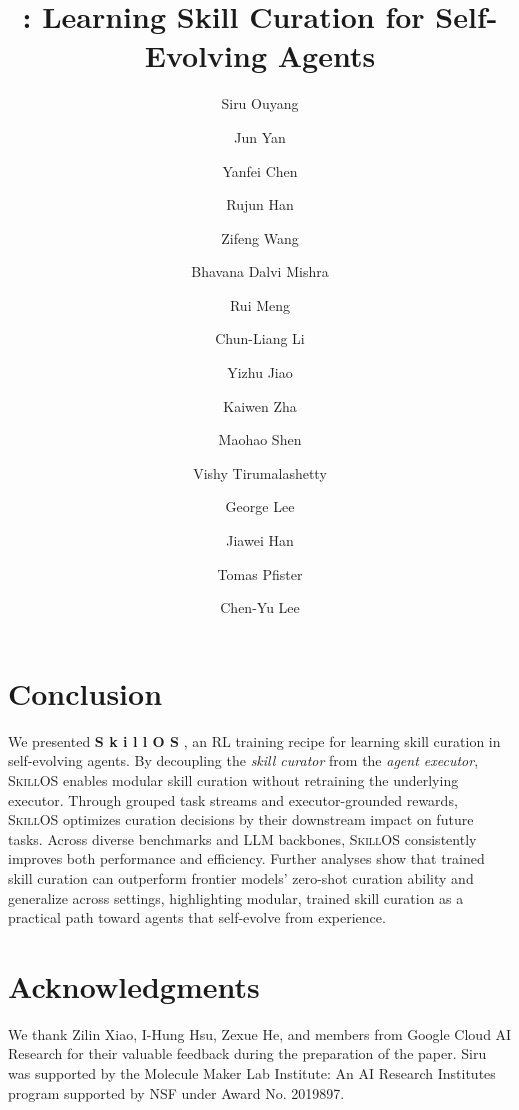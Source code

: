 \documentclass[11pt, a4paper, logo, copyright]{googlecloud}
\title{\skillos{}: Learning Skill Curation for Self-Evolving Agents}
\author[1*]{Siru Ouyang}
\author[2$\dagger$]{Jun Yan}
\author[2]{Yanfei Chen}
\author[2]{Rujun Han}
\author[2]{Zifeng Wang}
\author[2]{Bhavana Dalvi Mishra}
\author[2]{Rui Meng}
\author[2]{Chun-Liang Li}
\author[1]{Yizhu Jiao}
\author[3]{Kaiwen Zha}
\author[3]{Maohao Shen}
\author[2]{Vishy Tirumalashetty}
\author[2]{George Lee}
\author[1]{Jiawei Han}
\author[2]{Tomas Pfister}
\author[2$\dagger$]{Chen-Yu Lee}
\affil[1]{University of Illinois Urbana-Champaign}
\affil[2]{Google Cloud AI Research}
\affil[3]{Massachusetts Institute of Technology}
\newcommand{\ours}{\textsc{SkillOS}\xspace}
\newcommand{\skillos}{
{\bfseries
\textcolor[HTML]{4285F4}{S}%
\textcolor[HTML]{EA4335}{k}%
\textcolor[HTML]{FBBC05}{i}%
\textcolor[HTML]{4285F4}{l}%
\textcolor[HTML]{34A853}{l}%
\textcolor[HTML]{FBBC05}{O}%
\textcolor[HTML]{34A853}{S}}\xspace
}
\begin{document}
\maketitle







\section{Conclusion}

We presented\skillos, an RL training recipe for learning skill curation in self-evolving agents. By decoupling the \emph{skill curator} from the \emph{agent executor}, \ours{} enables modular skill curation without retraining the underlying executor. Through grouped task streams and executor-grounded rewards, \ours{} optimizes curation decisions by their downstream impact on future tasks. Across diverse benchmarks and LLM backbones, \ours{} consistently improves both performance and efficiency. Further analyses show that trained skill curation can outperform frontier models' zero-shot curation ability and generalize across settings, highlighting modular, trained skill curation as a practical path toward agents that self-evolve from experience.

\section{Acknowledgments}
We thank Zilin Xiao, I-Hung Hsu, Zexue He, and members from Google Cloud AI Research for their valuable feedback during the preparation of the paper. Siru was supported by the Molecule Maker Lab Institute: An AI Research Institutes program supported by NSF under Award No. 2019897.


\nobibliography*


\clearpage
\appendix

\end{document}
